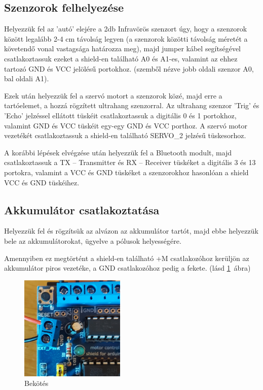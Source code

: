\documentclass[]{thesis-ekf}
\theoremstyle{definition}
\begin{document}
\subsection{Szenzorok felhelyezése}
Helyezzük fel az ’autó’ elejére a 2db Infravörös szenzort úgy, hogy a szenzorok között legalább 2-4 cm távolság legyen (a szenzorok közötti távolság méretét a követendő vonal vastagsága határozza meg), majd jumper kábel segítségével csatlakoztassuk ezeket a shield-en található A0 és A1-es, valamint az ehhez tartozó GND és VCC jelölésű portokhoz. (szemből nézve jobb oldali szenzor A0, bal oldali A1).

Ezek után helyezzük fel a szervó motort a szenzorok közé, majd erre a tartóelemet, a hozzá rögzített ultrahang szenzorral. Az ultrahang szenzor ’Trig’ és ’Echo’ jelzéssel ellátott tüskéit csatlakoztassuk a digitális 0 és 1 portokhoz, valamint GND és VCC tüskéit egy-egy GND és VCC porthoz. A szervó motor vezetékét csatlakoztassuk a shield-en található SERVO\_2 jelzésű tüskesorhoz.

A korábbi lépések elvégzése után helyezzük fel a Bluetooth modult, majd csatlakoztassuk a TX -- Transmitter és RX -- Receiver tüskéket a digitális 3 és 13 portokra, valamint a VCC és GND tüskéket a szenzorokhoz hasonlóan a shield VCC és GND tüskéihez.
\subsection{Akkumulátor csatlakoztatása}
Helyezzük fel és rögzítsük az alvázon az akkumulátor tartót, majd ebbe helyezzük bele az akkumulátorokat, ügyelve a pólusok helyességére.

Amennyiben ez megtörtént a shield-en található +M csatlakozóhoz kerüljön az akkumulátor piros vezetéke, a GND csatlakozóhoz pedig a fekete. (lásd \ref{akku}~ábra)
\begin{figure}[h]
	\centering
	\includegraphics[width=5cm]{images/robot_build/akku-connect}
	\caption{Bekötés}
	\label{akku}
\end{figure}
\end{document}
